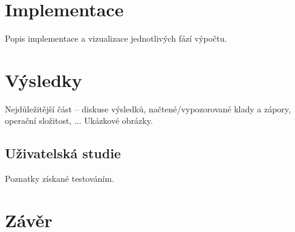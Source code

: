 \documentclass[11pt,a4paper,oneside]{article}
\begin{document}
\section{Implementace}
Popis implementace a vizualizace jednotlivých fází výpočtu.


\section{Výsledky}
Nejdůležitější část -- diskuse výsledků, 
načtené/vypozorované klady a zápory, operační složitost, ...
Ukázkové obrázky.

\subsection{Uživatelská studie}

Poznatky získané testováním.


\section{Závěr}



\end{document}
